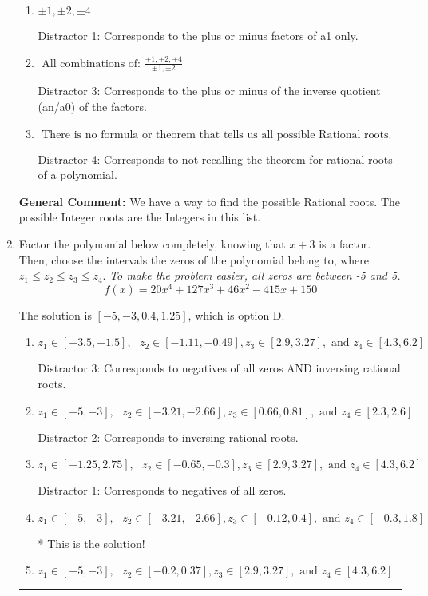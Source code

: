 \documentclass{extbook}[14pt]
\newcommand{\litem}[1]{\item #1

\rule{\textwidth}{0.4pt}}
\begin{document}
\begin{enumerate}
{\begin{enumerate}[label=\Alph*.]
* This is the solution \textbf{since we asked for the possible Rational roots}!
\item \( \pm 1,\pm 2,\pm 4 \)

 Distractor 1: Corresponds to the plus or minus factors of a1 only.
\item \( \text{ All combinations of: }\frac{\pm 1,\pm 2,\pm 4}{\pm 1,\pm 2} \)

 Distractor 3: Corresponds to the plus or minus of the inverse quotient (an/a0) of the factors. 
\item \( \text{ There is no formula or theorem that tells us all possible Rational roots.} \)

 Distractor 4: Corresponds to not recalling the theorem for rational roots of a polynomial.
\end{enumerate}

\textbf{General Comment:} We have a way to find the possible Rational roots. The possible Integer roots are the Integers in this list.
}
\litem{
Factor the polynomial below completely, knowing that $x+3$ is a factor. Then, choose the intervals the zeros of the polynomial belong to, where $z_1 \leq z_2 \leq z_3 \leq z_4$. \textit{To make the problem easier, all zeros are between -5 and 5.}
\[ f(x) = 20x^{4} +127 x^{3} +46 x^{2} -415 x + 150 \]

The solution is \( [-5, -3, 0.4, 1.25] \), which is option D.\begin{enumerate}[label=\Alph*.]
\item \( z_1 \in [-3.5, -1.5], \text{   }  z_2 \in [-1.11, -0.49], z_3 \in [2.9, 3.27], \text{   and   } z_4 \in [4.3, 6.2] \)

 Distractor 3: Corresponds to negatives of all zeros AND inversing rational roots.
\item \( z_1 \in [-5, -3], \text{   }  z_2 \in [-3.21, -2.66], z_3 \in [0.66, 0.81], \text{   and   } z_4 \in [2.3, 2.6] \)

 Distractor 2: Corresponds to inversing rational roots.
\item \( z_1 \in [-1.25, 2.75], \text{   }  z_2 \in [-0.65, -0.3], z_3 \in [2.9, 3.27], \text{   and   } z_4 \in [4.3, 6.2] \)

 Distractor 1: Corresponds to negatives of all zeros.
\item \( z_1 \in [-5, -3], \text{   }  z_2 \in [-3.21, -2.66], z_3 \in [-0.12, 0.4], \text{   and   } z_4 \in [-0.3, 1.8] \)

* This is the solution!
\item \( z_1 \in [-5, -3], \text{   }  z_2 \in [-0.2, 0.37], z_3 \in [2.9, 3.27], \text{   and   } z_4 \in [4.3, 6.2] \)


\end{enumerate}}
\end{enumerate}
\end{document}
